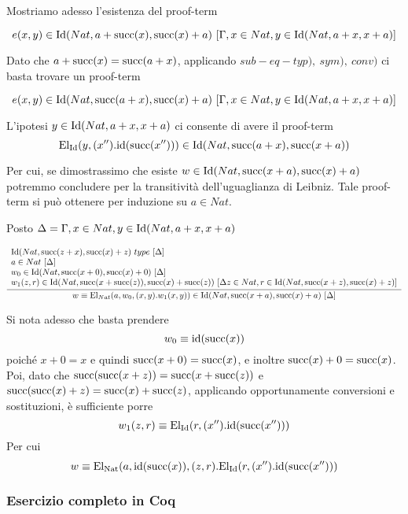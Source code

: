 Mostriamo adesso l'esistenza del proof-term 

\[e(x, y)\in \mathrm{Id}(Nat, a+\mathrm{succ}(x), \mathrm{succ}(x)+a)\ [\Gamma, x\in Nat, y\in \mathrm{Id}(Nat, a+x, x+a)]\]

Dato che $a+\mathrm{succ}(x) = \mathrm{succ}(a+x)$, applicando $sub-eq-typ),\ sym),\ conv)$ ci basta trovare un proof-term

\[e(x, y)\in \mathrm{Id}(Nat, \mathrm{succ}(a+x), \mathrm{succ}(x)+a)\ [\Gamma, x\in Nat, y\in \mathrm{Id}(Nat, a+x, x+a)]\]

L'ipotesi $y \in \mathrm{Id}(Nat, a+x, x+a)$ ci consente di avere il proof-term
\[ \mathrm{El}_{\mathrm{Id}}(y, (x'').\mathrm{id}(\mathrm{succ}(x''))) \in \mathrm{Id}(Nat, \mathrm{succ}(a+x), \mathrm{succ}(x+a))\]

Per cui, se dimostrassimo che esiste $w \in \mathrm{Id}(Nat, \mathrm{succ}(x+a), \mathrm{succ}(x)+a)$ potremmo concludere per la transitività dell'uguaglianza di Leibniz. Tale proof-term si può ottenere per induzione su $a\in Nat$.

Posto $\Delta = \Gamma, x\in Nat, y\in \mathrm{Id}(Nat, a+x, x+a)$

\begin{scriptsize}
	\[ \infer{w \equiv \mathrm{El}_{Nat}(a, w_0, (x, y).w_1(x,y)) \in \Id{Nat}{\suc{x+a}}{\suc{x}+a}\ [\Delta]}{\begin{array}{l}
		\Id{Nat}{\suc{z+x}}{\suc{x}+z}\ type\ [\Delta] \\ a\in Nat\ [\Delta] \\  w_0\in \Id{Nat}{\suc{x+0}}{\suc{x}+0}\ [\Delta] \\ w_1(z, r)\in \Id{Nat}{\suc{x+\suc{z}}}{\suc{x}+\suc{z}}\ [\Delta z\in Nat, r\in \Id{Nat}{\suc{x+z}}{\suc{x}+z}]\end{array}} \]
\end{scriptsize}

Si nota adesso che basta prendere
\[ w_0 \equiv \mathrm{id}(\mathrm{succ}(x))\] poiché $x+0 = x$ e quindi $\mathrm{succ}(x+0) = \mathrm{succ}(x)$, e inoltre $\mathrm{succ}(x)+0 = \mathrm{succ}(x)$. Poi, dato che $\mathrm{succ}(\mathrm{succ}(x+z)) = \mathrm{succ}(x+\mathrm{succ}(z))$ e $\mathrm{succ}(\mathrm{succ}(x)+z) = \mathrm{succ}(x)+\mathrm{succ}(z)$, applicando opportunamente conversioni e sostituzioni, è sufficiente porre
\[ w_1(z, r) \equiv \mathrm{El}_{\mathrm{Id}}(r, (x'').\mathrm{id}(\mathrm{succ}(x'')))\]
Per cui
\[w \equiv \mathrm{El}_{\mathrm{Nat}}(a, \mathrm{id}(\mathrm{succ}(x)), (z,r).\mathrm{El}_{\mathrm{Id}}(r, (x'').\mathrm{id}(\mathrm{succ}(x''))) \]

\subsubsection{Esercizio completo in Coq}



